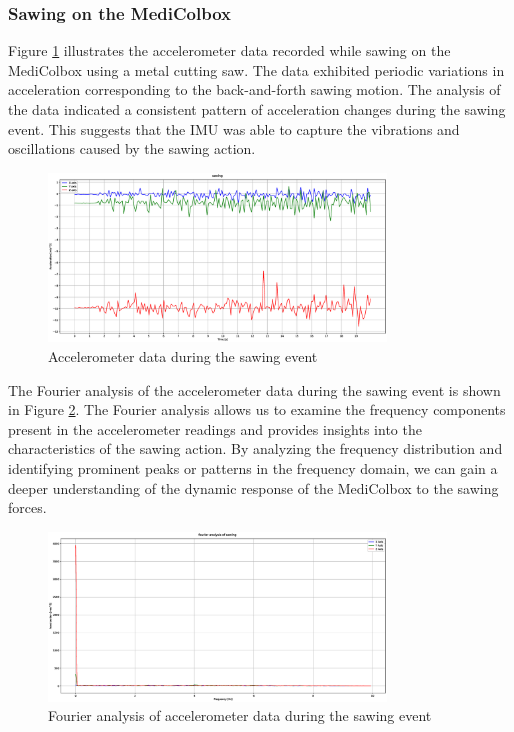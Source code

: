 \documentclass[../main.tex]{subfiles}
\begin{document}
\clearpage

\subsubsection{Sawing on the MediColbox}

Figure \ref{fig:accelerometer_sawing} illustrates the
accelerometer data recorded while sawing on the
MediColbox using a metal cutting saw.
The data exhibited periodic variations in acceleration
corresponding to the back-and-forth sawing motion.
The analysis of the data indicated a consistent pattern of
acceleration changes during the sawing event. This suggests that the IMU was able to capture the vibrations and oscillations caused by the sawing action.

\begin{figure}[htbp]
    \centering
    \includegraphics[width=0.8\textwidth]{resources/figures/Acceleration_sawing.eps}
    \caption{Accelerometer data during the sawing event}
    \label{fig:accelerometer_sawing}
\end{figure}

The Fourier analysis of the accelerometer data during the sawing event is shown in Figure \ref{fig:fourier_accelerometer_sawing}. The Fourier analysis allows us to examine the frequency components present in the accelerometer readings and provides insights into the characteristics of the sawing action. By analyzing the frequency distribution and identifying prominent peaks or patterns in the frequency domain, we can gain a deeper understanding of the dynamic response of the MediColbox to the sawing forces.

\begin{figure}[htbp]
    \centering
    \includegraphics[width=0.8\textwidth]{resources/figures/Fourier_acceleration_sawing.eps}
    \caption{Fourier analysis of accelerometer data during the sawing event}
    \label{fig:fourier_accelerometer_sawing}
\end{figure}
\end{document}
